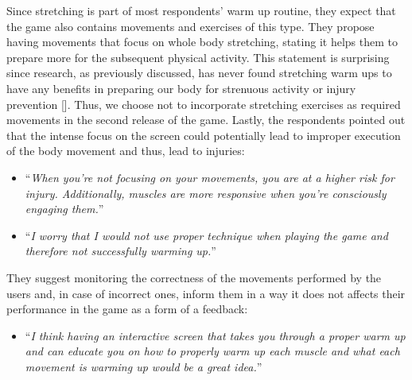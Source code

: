 Since stretching is part of most respondents' warm up routine, they expect that the game also contains movements and exercises of this type. They propose having movements that focus on whole body stretching, stating it helps them to prepare more for the subsequent physical activity. This statement is surprising since research, as previously discussed,  has never found stretching warm ups to have any benefits in preparing our body for strenuous activity or injury prevention []. Thus, we choose not to incorporate stretching exercises as required movements in the second release of the game. Lastly, the respondents pointed out that the intense focus on the screen could potentially lead to improper execution of the body movement and thus, lead to injuries:
\begin{itemize}
\item ``\textit{When you're not focusing on your movements, you are at a higher risk for injury. Additionally, muscles are more responsive when you're consciously engaging them.}''
\item ``\textit{I worry that I would not use proper technique when playing the game and therefore not successfully warming up.}''
\end{itemize}
They suggest monitoring the correctness of the movements performed by the users and, in case of incorrect ones, inform them in a way it does not affects their performance in the game as a form of a feedback:
\begin{itemize}
\item ``\textit{I think having an interactive screen that takes you through a proper warm up and can educate you on how to properly warm up each muscle and what each movement is warming up would be a great idea.}''
\end{itemize}
